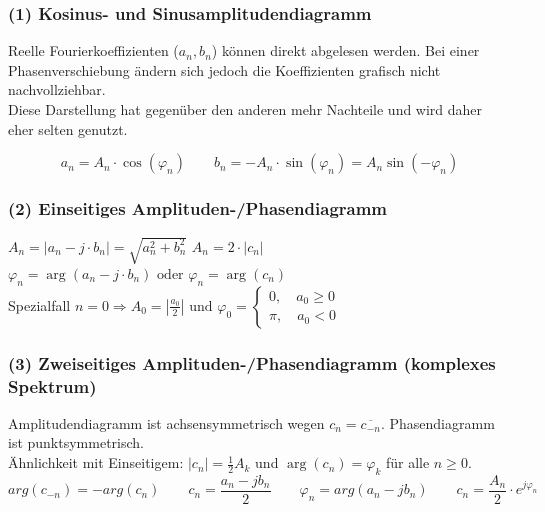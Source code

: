 \subsubsection{(1) Kosinus- und Sinusamplitudendiagramm} 
Reelle Fourierkoeffizienten ($a_n, b_n$) können direkt abgelesen werden. 
Bei einer Phasenverschiebung ändern sich jedoch die Koeffizienten grafisch nicht nachvollziehbar. \\
Diese Darstellung hat gegenüber den anderen mehr Nachteile und wird daher eher selten genutzt.

$$a_n = A_n \cdot \cos(\varphi_n) \qquad b_n = -A_n \cdot \sin(\varphi_n) = A_n \sin(-\varphi_n)$$


\subsubsection{(2) Einseitiges Amplituden-/Phasendiagramm} 
$A_n = |a_n - j \cdot b_n| = \sqrt{a_n^2 + b_n^2}$  $A_n = 2 \cdot |c_n| \qquad$
$\varphi_n = \arg(a_n - j \cdot b_n) \text{ oder } \varphi_n = \arg(c_n) $ \\
Spezialfall $n=0 \Rightarrow A_0 = |\frac{a_0}{2}| \text{ und } \varphi_0 = \left\{
		\begin{array}{l} 
			0, \quad a_0 \geq 0\\
			\pi, \quad a_0 < 0  
		\end{array}
	    \right. $\\

\subsubsection{(3) Zweiseitiges Amplituden-/Phasendiagramm (komplexes Spektrum)} 
Amplitudendiagramm ist achsensymmetrisch wegen $ c_n=\overline{c_{-n}} $. Phasendiagramm ist punktsymmetrisch. \\
Ähnlichkeit mit Einseitigem: $|c_n| = \frac{1}{2}A_k $ und $\arg(c_n) = \varphi_k$ für alle $ n \geq 0$.\\
$$arg(c_{-n}) = -arg(c_n) \qquad c_n = \frac{a_n - jb_n}{2} \qquad \varphi_n = arg(a_n - jb_n) \qquad c_n = \frac{A_n}{2} \cdot e^{j\varphi_n}$$


